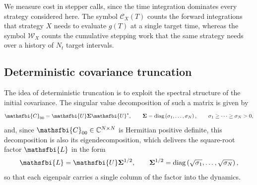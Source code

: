 We measure cost in stepper calls, since the time integration dominates every strategy considered
here. The symbol \(\mathcal{C}_{X}(T)\) counts the forward integrations that strategy \(X\) needs to
evaluate \(g(T)\) at a single target time, whereas the symbol \(\mathcal{W}_{X}\) counts the
cumulative stepping work that the same strategy needs over a history of \(N_t\) target intervals.

\subsection{Deterministic covariance truncation}
\label{sec:appendix_deterministic_truncation}
\label{sec:appendix_necessity_sste}

The idea of deterministic truncation is to exploit the spectral structure of the initial covariance.
The singular value decomposition of such a matrix is given by
\begin{equation}
  \mathsfbi{C}_{00}
  =
  \mathsfbi{U}\boldsymbol{\Sigma}\mathsfbi{U}^{*},
  \qquad
  \boldsymbol{\Sigma}
  =
  \operatorname{diag}
  \left(
    \sigma_1,\dots,\sigma_N
  \right),
  \qquad
  \sigma_1\geq\dots\geq\sigma_N>0,
  \label{eq:C00_eigendecomposition_sste_necessity}
\end{equation}
and, since \(\mathsfbi{C}_{00}\in\mathbb{C}^{N\times N}\) is Hermitian positive definite, this
decomposition is also its eigendecomposition, which delivers the square-root factor
\(\mathsfbi{L}\) in the form
\begin{equation}
  \mathsfbi{L}
  =
  \mathsfbi{U}\boldsymbol{\Sigma}^{1/2},
  \qquad
  \boldsymbol{\Sigma}^{1/2}
  =
  \operatorname{diag}
  \left(
    \sqrt{\sigma_1},\dots,\sqrt{\sigma_N}
  \right),
  \label{eq:C00_square_root_factor_sste_necessity}
\end{equation}
so that each eigenpair carries a single column of the factor into the dynamics.

